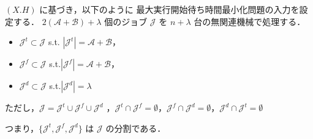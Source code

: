 \documentclass[12pt]{optlab-bachelor}
\begin{document}
$(X.H)$ に基づき，以下のように 最大実行開始待ち時間最小化問題の入力を設定する．
$2(\mathcal{A} + \mathcal{B}) + \lambda$ 個のジョブ $\mathcal{J}$ を
$n + \lambda$ 台の無関連機械で処理する．
\begin{itemize}
  \item $\mathcal{J}^t \subset \mathcal{J}$ s.t. $|\mathcal{J}^t| =
  \mathcal{A}  + \mathcal{B}$，
  \item $\mathcal{J}^f \subset \mathcal{J}$
  s.t.$|\mathcal{J}^f| = \mathcal{A}  + \mathcal{B}$，
  \item $\mathcal{J}^d \subset \mathcal{J}$ s.t.$|\mathcal{J}^d| =
  \lambda$
\end{itemize}
ただし，$\mathcal{J} = \mathcal{J}^t \cup \mathcal{J}^f \cup
\mathcal{J}^d$ ，$\mathcal{J}^t \cap \mathcal{J}^f = \emptyset$，$\mathcal{J}^f \cap \mathcal{J}^d = \emptyset$，$\mathcal{J}^d \cap \mathcal{J}^t = \emptyset$

つまり，$\{\mathcal{J}^t, \mathcal{J}^f,\mathcal{J}^d\}$ は $\mathcal{J}$ の分割である．
\end{document}
